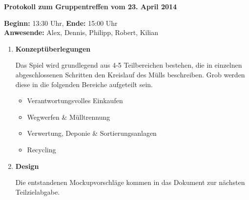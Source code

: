 \documentclass[a4paper]{article}
\newcommand{\changefont}[3]{
\fontfamily{#1} \fontseries{#2} \fontshape{#3} \selectfont}
\newcommand{\TOP}[1]{\item \textbf{#1}\par}
\begin{document}
\changefont{cmss}{m}{n} %

\begin{center}
\textbf{\Large Protokoll zum Gruppentreffen vom 23. April 2014}
\end{center}
\vspace{3mm}

\textbf{Beginn:} 13:30 Uhr, \textbf{Ende:} 15:00 Uhr\\
\textbf{Anwesende:} Alex, Dennis, Philipp, Robert, Kilian

\vspace{5mm}

\begin{enumerate}

\TOP{Konzeptüberlegungen}
Das Spiel wird grundlegend aus 4-5 Teilbereichen bestehen, die in einzelnen abgeschlossenen Schritten den Kreislauf des Mülls beschreiben. Grob werden diese in die folgenden Bereiche aufgeteilt sein.
\begin{itemize}
\item Verantwortungsvolles Einkaufen
\item Wegwerfen \& Mülltrennung
\item Verwertung, Deponie \& Sortierungsanlagen
\item Recycling
\end{itemize}


\TOP{Design}
Die entstandenen Mockupvorschläge kommen in das Dokument zur nächsten Teilzielabgabe.

\end{enumerate}


\makeatletter
\def\footrule{{
  \vskip-\footruleskip\vskip-\footrulewidth
  \color{\footrulecolor}
  \hrule\@width\headwidth\@height
  \footrulewidth\vskip\footruleskip
}}
\makeatother
\renewcommand{\footrulewidth}{3pt}
\newcommand{\footrulecolor}{dgreen}
\end{document}
